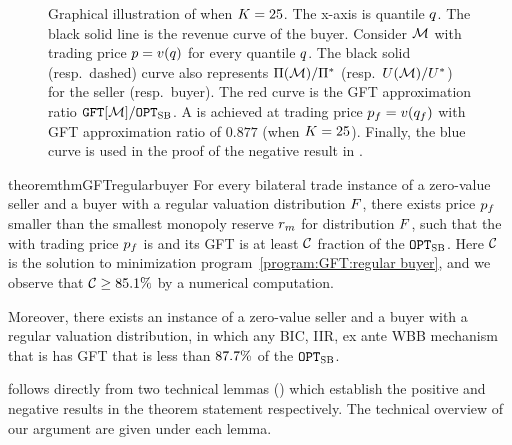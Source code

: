 \begin{figure}
    \centering
    
    \caption{Graphical illustration of  when $K = 25$. The x-axis is quantile $q$. 
    The black solid line is the revenue curve of the buyer.
    Consider {\FixPrice} $\mathcal{M}$ with trading price $p = v(q)$ for every quantile $q$. The black solid (resp.\ dashed) curve also represents   ${\Pi(\mathcal{M})}/{\Pi^*}$ (resp.\ ${U(\mathcal{M})}/{U^*}$) for the seller (resp.\ buyer). The red curve is the GFT approximation ratio ${\GFT{\mech}}/{\OPTSB}$. 
    A {\ksfair} {\FixPrice} is achieved at trading price $p_f = v(q_f)$ with GFT approximation ratio of $0.877$ (when $K = 25$).
    Finally, the blue curve is used in the proof of the negative result in .}
    \label{fig:BROM:regular}
\end{figure}

\begin{restatable}{theorem}{thmGFTregularbuyer}
\label{thm:improved GFT:regular buyer}
    For every bilateral trade instance of a zero-value seller and a buyer with a regular valuation distribution $F$, there exists price $p_f$ smaller than the smallest monopoly reserve $r_m$ for distribution $F$, such that the {\FixPrice} with trading price $p_f$ is {\ksfair} and its GFT is at least $\mathcal{C}$ fraction of the {\SecondBest} $\texttt{OPT}_{\textsc{SB}}$. Here $\mathcal{C}$ is the solution to minimization program~\ref{program:GFT:regular buyer},
    and we observe that 
    $\mathcal{C}\geq {85.1\%}$ by a numerical computation.

    Moreover, there exists an instance of a zero-value seller and a  buyer with a regular valuation distribution, in which any BIC, IIR, ex ante WBB mechanism that is {\ksfair} has GFT that is less than  ${87.7\%}$ of the {\SecondBest} $\texttt{OPT}_{\textsc{SB}}$.
\end{restatable}

 follows directly from two technical lemmas () which establish the positive and negative results in the theorem statement respectively. The technical overview of our argument are given under each lemma.


